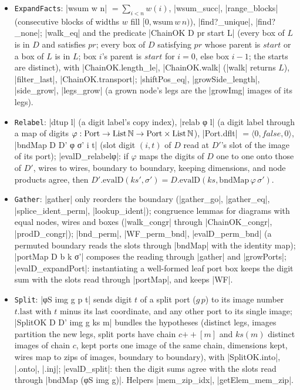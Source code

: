 \begin{itemize}
\item \texttt{ExpandFacts}: \lean|wsum w n| $=\sum_{i<n}w(i)$, \lean|wsum_succ|, \lean|range_blocks|
  (consecutive blocks of widths $w$ fill $[0,\mathrm{wsum}\,w\,n)$), \lean|find?_unique|,
  \lean|find?_none|; \lean|walk_eq| and the predicate \lean|ChainOK D pr start L| (every box of $L$ is
  in $D$ and satisfies $pr$; every box of $D$ satisfying $pr$ whose parent is $start$ or a box of $L$ is
  in $L$; box $i$'s parent is $start$ for $i=0$, else box $i-1$; the starts are distinct), with
  \lean|ChainOK.length_le|, \lean|ChainOK.walk| (\lean|walk| returns $L$), \lean|filter_last|,
  \lean|ChainOK.transport|; \lean|shiftPos_eq|, \lean|growSide_length|, \lean|side_grow|,
  \lean|legs_grow| (a grown node's legs are the \lean|growImg| images of its legs).
\item \texttt{Relabel}: \lean|dtup l| (a digit label's copy index), \leanLLone|relab φ l| (a digit label
  through a map of digits $\varphi:\mathrm{Port}\to\mathrm{List}\,\mathbb{N}\to\mathrm{Port}\times\mathrm{List}\,\mathbb{N}$),
  \lean|Port.dflt| $=\langle0,\mathit{false},0\rangle$, \leanLLone|bndMap D D' φ σ' i t| (slot digit $(i,t)$ of
  $D$ read at $D'$'s slot of the image of its port); \leanLLone|evalD_relabelφ|: if $\varphi$ maps the
  digits of $D$ one to one onto those of $D'$, wires to wires, boundary to boundary, keeping
  dimensions, and node products agree, then $D'.\mathrm{evalD}(ks',\sigma')=D.\mathrm{evalD}(ks,\mathrm{bndMap}\,\varphi\,\sigma')$.
\item \texttt{Gather}: \lean|gather| only reorders the boundary (\lean|gather_go|, \lean|gather_eq|,
  \lean|splice_ident_perm|, \lean|lookup_ident|); congruence lemmas for diagrams with equal nodes,
  wires and boxes (\lean|walk_congr| through \lean|ChainOK_congr|, \lean|prodD_congr|);
  \lean|bnd_perm|, \lean|WF_perm_bnd|, \lean|evalD_perm_bnd| (a permuted boundary reads the slots
  through \lean|bndMap| with the identity map); \lean|portMap D b k σ'| composes the reading through
  \lean|gather| and \lean|growPorts|; \lean|evalD_expandPort|: instantiating a well-formed leaf port box
  keeps the digit sum with the slots read through \lean|portMap|, and keeps \lean|WF|.
\item \texttt{Split}: \leanLLone|φS img g p t| sends digit $t$ of a split port ($g\,p$) to its image number
  $t.\mathrm{last}$ with $t$ minus its last coordinate, and any other port to its single image;
  \lean|SplitOK D D' img g ks m| bundles the hypotheses (distinct legs, images partition the new legs,
  split ports have chain $c\mathbin{+\!\!+}[m]$ and $ks(m)$ distinct images of chain $c$, kept ports one image
  of the same chain, dimensions kept, wires map to zips of images, boundary to boundary), with
  \lean|SplitOK.into|, \lean|.onto|, \lean|.inj|; \lean|evalD_split|: then the digit sums agree with the
  slots read through \leanLLone|bndMap (φS img g)|. Helpers \lean|mem_zip_idx|, \lean|getElem_mem_zip|.
\end{itemize}

